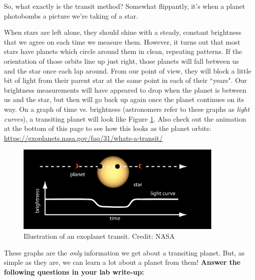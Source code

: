 \documentclass[11pt]{article}
\begin{document}
\medskip \noindent
So, what exactly is the transit method? Somewhat flippantly, it’s when a planet photobombs a picture we’re taking of a star.

\medskip \noindent
When stars are left alone, they should shine with a steady, constant brightness that we agree on each time we measure them. However, it turns out that most stars have planets which circle around them in clean, repeating patterns. If the orientation of those orbits line up just right, those planets will fall between us and the star once each lap around. From our point of view, they will block a little bit of light from their parent star at the same point in each of their ``years". Our brightness measurements will have appeared to drop when the planet is between us and the star, but then will go back up again once the planet continues on its way. On a graph of time vs. brightness (astronomers refer to these graphs as \textit{light curves}), a transiting planet will look like Figure \ref{fig:transit}. Also check out the animation at the bottom of this page to see how this looks as the planet orbits: \url{https://exoplanets.nasa.gov/faq/31/whats-a-transit/}

\begin{figure}[h!]
    \centering
    \includegraphics[width=0.9\textwidth]{Images/transit_cartoon.png}
    \caption{Illustration of an exoplanet transit. Credit: NASA}
    \label{fig:transit}
\end{figure}

\medskip \noindent
These graphs are the \textit{only} information we get about a transiting planet. But, as simple as they are, we can learn a lot about a planet from them!  \textbf{Answer the following questions in your lab write-up:}
\end{document}
